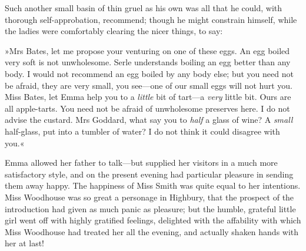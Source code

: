 Such another small basin of thin gruel as his own was all that he could, with thorough self-approbation, recommend; though he might constrain himself, while the ladies were comfortably clearing the nicer things, to say:

»Mrs Bates, let me propose your venturing on one of these eggs. An egg boiled very soft is not unwholesome. Serle understands boiling an egg better than any body. I would not recommend an egg boiled by any body else; but you need not be afraid, they are very small, you see—one of our small eggs will not hurt you. Miss Bates, let Emma help you to a \textit{little} bit of tart—a \textit{very} little bit. Ours are all apple-tarts. You need not be afraid of unwholesome preserves here. I do not advise the custard. Mrs Goddard, what say you to \textit{half} a glass of wine? A \textit{small} half-glass, put into a tumbler of water? I do not think it could disagree with you.«

Emma allowed her father to talk—but supplied her visitors in a much more satisfactory style, and on the present evening had particular pleasure in sending them away happy. The happiness of Miss Smith was quite equal to her intentions. Miss Woodhouse was so great a personage in Highbury, that the prospect of the introduction had given as much panic as pleasure; but the humble, grateful little girl went off with highly gratified feelings, delighted with the affability with which Miss Woodhouse had treated her all the evening, and actually shaken hands with her at last!